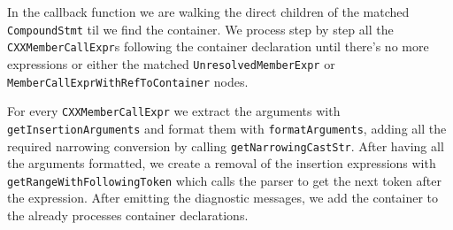 \par In the callback function we are walking the direct children of the matched \verb|CompoundStmt| til we find the container. We process step by step all the \\\verb|CXXMemberCallExpr|s following the container declaration until there's no more expressions or either the matched \verb|UnresolvedMemberExpr| or \\\verb|MemberCallExprWithRefToContainer| nodes. \medskip
\par For every \verb|CXXMemberCallExpr| we extract the arguments with \\\verb|getInsertionArguments| and format them with \verb|formatArguments|, adding all the required narrowing conversion by calling \verb|getNarrowingCastStr|. After having all the arguments formatted, we create a removal of the insertion expressions with \verb|getRangeWithFollowingToken| which calls the parser to get the next token after the expression. After emitting the diagnostic messages, we add the container to the already processes container declarations.
